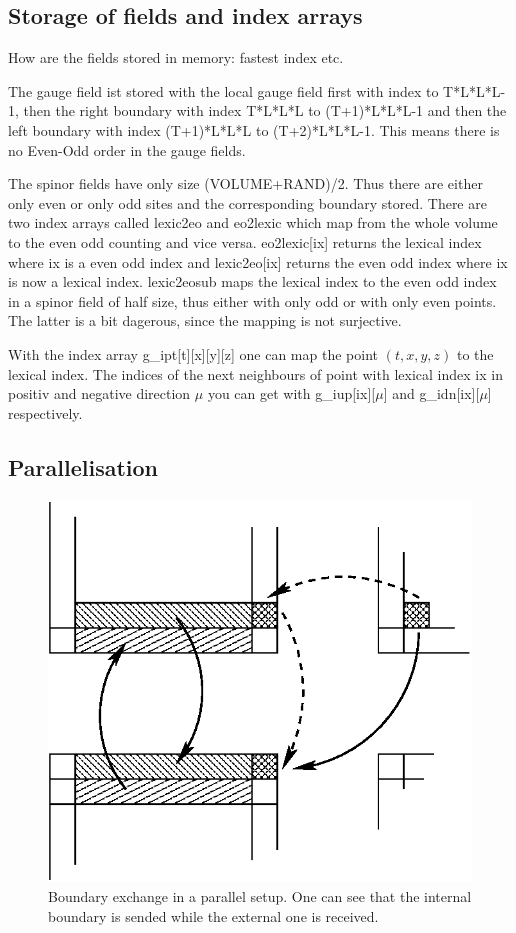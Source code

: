 \subsection{Storage of fields and index arrays}

How are the fields stored in memory: fastest index etc.

The gauge field ist stored with the local gauge field first with index
{ to T*L*L*L-1}, then the right boundary with index
{\ttfamily T*L*L*L to (T+1)*L*L*L-1} and then the left boundary with index
{\ttfamily (T+1)*L*L*L to (T+2)*L*L*L-1}. This means there is no
Even-Odd order in the gauge fields. 

The spinor fields have only size {\ttfamily (VOLUME+RAND)/2}. Thus
there are either only even or only odd sites and the corresponding
boundary stored. There are two index arrays called {\ttfamily lexic2eo}
and {\ttfamily eo2lexic} which map from the whole volume to the even odd
counting and vice versa. {\ttfamily eo2lexic[ix]} returns the lexical
index where {\ttfamily ix} is a even odd index and
{\ttfamily lexic2eo[ix]} returns the even odd index where {\ttfamily ix}
is now a lexical index. {\ttfamily lexic2eosub} maps the lexical index
to the even odd index in a spinor field of half size, thus either with
only odd or with only even points. The latter is a bit dagerous, since
the mapping is not surjective.

With the index array {\ttfamily g\_ipt[t][x][y][z]} one can map the
point $(t,x,y,z)$ to the lexical index. The indices of the next
neighbours of point with lexical index {\ttfamily ix} in positiv and
negative direction $\mu$ you can get with
{\ttfamily g\_iup[ix][$\mu$]} and {\ttfamily g\_idn[ix][$\mu$]}
respectively.

\subsection{Parallelisation}

\begin{figure}[htbp]
\centering
\includegraphics[width=0.65\linewidth]{partition}
\caption{Boundary exchange in a parallel setup. One can see that the
  internal boundary is sended while the external one is received.}
\label{fig:partition}
\end{figure}

